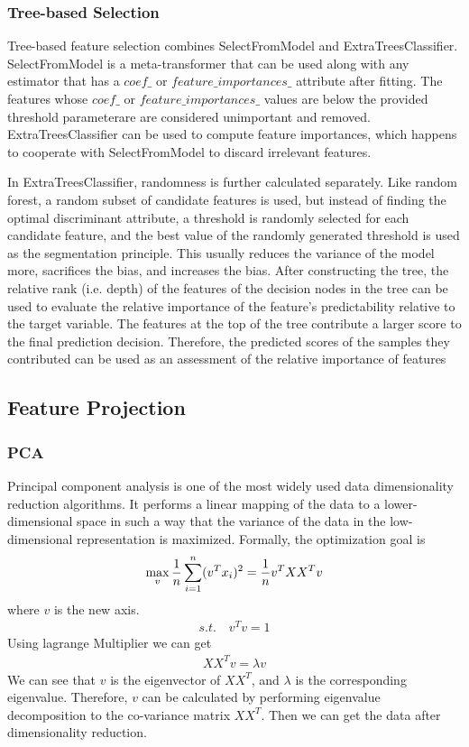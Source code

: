 \documentclass{article}
\begin{document}
\subsubsection{Tree-based Selection}
\indent Tree-based feature selection combines SelectFromModel and ExtraTreesClassifier. SelectFromModel is a meta-transformer that can be used along with any estimator that has a $coef\_$ or $feature\_importances\_$ attribute after fitting. The features whose $coef\_$ or $feature\_importances\_$ values are below the provided threshold parameterare are considered unimportant and removed. ExtraTreesClassifier can be used to compute feature importances, which happens to cooperate with SelectFromModel to discard irrelevant features.\par
\indent In ExtraTreesClassifier, randomness is further calculated separately. Like random forest, a random subset of candidate features is used, but instead of finding the optimal discriminant attribute, a threshold is randomly selected for each candidate feature, and the best value of the randomly generated threshold is used as the segmentation principle. This usually reduces the variance of the model more, sacrifices the bias, and increases the bias. After constructing the tree, the relative rank (i.e. depth) of the features of the decision nodes in the tree can be used to evaluate the relative importance of the feature's predictability relative to the target variable. The features at the top of the tree contribute a larger score to the final prediction decision. Therefore, the predicted scores of the samples they contributed can be used as an assessment of the relative importance of features

\subsection{Feature Projection}
\subsubsection{PCA}
\indent Principal component analysis is one of the most widely used data dimensionality reduction algorithms. It performs a linear mapping of the data to a lower-dimensional space in such a way that the variance of the data in the low-dimensional representation is maximized\cite{pearson1901liii}.
Formally, the optimization goal is
\begin{eqnarray}
\centering
\max_v \frac{1}{n}\sum_{i=1}^{n}(v^Tx_i)^2=\frac{1}{n}v^TXX^Tv
\end{eqnarray}
where $v$ is the new axis.
\begin{eqnarray}
s.t.\quad v^Tv=1
\end{eqnarray}
Using lagrange Multiplier we can get
\begin{eqnarray}
XX^Tv=\lambda v
\end{eqnarray}
We can see that $v$ is the eigenvector of $XX^T$, and $\lambda$ is the corresponding eigenvalue. Therefore, $v$ can be calculated by performing eigenvalue decomposition to the co-variance matrix $XX^T$. Then we can get the data after dimensionality reduction.
\end{document}
